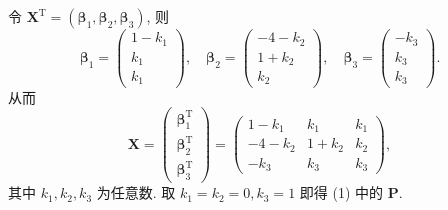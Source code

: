 \documentclass[../../main.tex]{subfiles}%
\begin{document}
\begin{solution}
令 $\boldsymbol{X}^\mathrm{T} = \left( \boldsymbol{\beta}_1, \boldsymbol{\beta}_2, \boldsymbol{\beta}_3 \right)$, 则
\[
\boldsymbol{\beta}_1 = \begin{pmatrix} 1 - k_1 \\ k_1 \\ k_1 \end{pmatrix}, \quad \boldsymbol{\beta}_2 = \begin{pmatrix} -4 - k_2 \\ 1 + k_2 \\ k_2 \end{pmatrix}, \quad \boldsymbol{\beta}_3 = \begin{pmatrix} -k_3 \\ k_3 \\ k_3 \end{pmatrix}.
\]
从而
\[
\boldsymbol{X} = \begin{pmatrix} 
\boldsymbol{\beta}_1^\mathrm{T} \\
\boldsymbol{\beta}_2^\mathrm{T} \\
\boldsymbol{\beta}_3^\mathrm{T} 
\end{pmatrix} = \begin{pmatrix} 
1 - k_1 & k_1 & k_1 \\
-4 - k_2 & 1 + k_2 & k_2 \\
-k_3 & k_3 & k_3 
\end{pmatrix},
\]
其中 $k_1, k_2, k_3$ 为任意数.
取 $k_1 = k_2 = 0, k_3 = 1$ 即得 (1) 中的 $\boldsymbol{P}$.

\end{solution}
\end{document}
